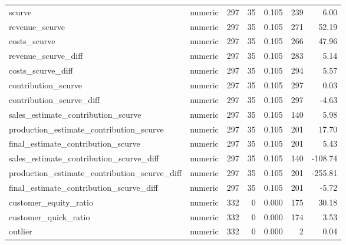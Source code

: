 \begin{landscape}
\begin{longtable}[t]{llrrrrr}
scurve & numeric & 297 & 35 & 0.105 & 239 & 6.00\\
revenue\_scurve & numeric & 297 & 35 & 0.105 & 271 & 52.19\\
costs\_scurve & numeric & 297 & 35 & 0.105 & 266 & 47.96\\
revenue\_scurve\_diff & numeric & 297 & 35 & 0.105 & 283 & 5.14\\
costs\_scurve\_diff & numeric & 297 & 35 & 0.105 & 294 & 5.57\\
contribution\_scurve & numeric & 297 & 35 & 0.105 & 297 & 0.03\\
contribution\_scurve\_diff & numeric & 297 & 35 & 0.105 & 297 & -4.63\\
sales\_estimate\_contribution\_scurve & numeric & 297 & 35 & 0.105 & 140 & 5.98\\
production\_estimate\_contribution\_scurve & numeric & 297 & 35 & 0.105 & 201 & 17.70\\
final\_estimate\_contribution\_scurve & numeric & 297 & 35 & 0.105 & 201 & 5.43\\
sales\_estimate\_contribution\_scurve\_diff & numeric & 297 & 35 & 0.105 & 140 & -108.74\\
production\_estimate\_contribution\_scurve\_diff & numeric & 297 & 35 & 0.105 & 201 & -255.81\\
final\_estimate\_contribution\_scurve\_diff & numeric & 297 & 35 & 0.105 & 201 & -5.72\\
customer\_equity\_ratio & numeric & 332 & 0 & 0.000 & 175 & 30.18\\
customer\_quick\_ratio & numeric & 332 & 0 & 0.000 & 174 & 3.53\\
outlier & numeric & 332 & 0 & 0.000 & 2 & 0.04\\*
\end{longtable}
\end{landscape}
\endgroup{}
